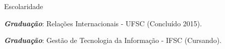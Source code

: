 \begin{rubric}
  {Escolaridade}
  {
    
    \entry* \emph{\textbf{Graduação}}: Relações Internacionais - UFSC
    (Concluído 2015).

    \entry* \emph{\textbf{Graduação}}: Gestão de
    Tecnologia da Informação - IFSC (Cursando).
    
  }
\end{rubric}

